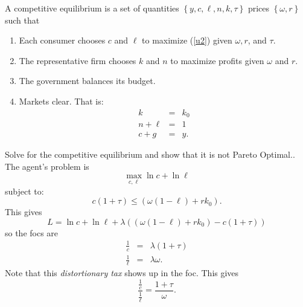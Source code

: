 \documentclass{sebase}
\begin{document}
A competitive equilibrium is a set of quantities $\left\{ y,c,\ell ,n,k,\tau
\right\} $ prices $\left\{ \omega ,r\right\} $ such that

\begin{enumerate}
\item Each consumer chooses $c$ and $\ell $ to maximize (\ref{u2}) given $%
\omega ,r$, and $\tau $.

\item The representative firm chooses $k$ and $n$ to maximize profits given $%
\omega $ and $r.$

\item The government balances its budget.

\item Markets clear. That is:%
\begin{eqnarray*}
k &=&k_{0} \\
n+\ell &=&1 \\
c+g &=&y.
\end{eqnarray*}%
\pagebreak
\end{enumerate}

Solve for the competitive equilibrium and show that it is not Pareto
Optimal.. The agent's problem is \ 
\begin{equation*}
\underset{c,\ell }{\max }\ln c+\ln \ell
\end{equation*}%
subject to:%
\begin{equation*}
c\left( 1+\tau \right) \leq \left( \omega \left( 1-\ell \right)
+rk_{0}\right) .
\end{equation*}%
This gives%
\begin{equation*}
L=\ln c+\ln \ell +\lambda \left( \left( \omega \left( 1-\ell \right)
+rk_{0}\right) -c\left( 1+\tau \right) \right)
\end{equation*}%
so the focs are%
\begin{eqnarray*}
\frac{1}{c} &=&\lambda \left( 1+\tau \right) \\
\frac{1}{\ell } &=&\lambda \omega .
\end{eqnarray*}%
Note that this \textit{distortionary tax} shows up in the foc. This gives 
\begin{equation*}
\frac{\frac{1}{c}}{\frac{1}{\ell }}=\frac{1+\tau }{\omega }.
\end{equation*}

\pagebreak
\end{document}
